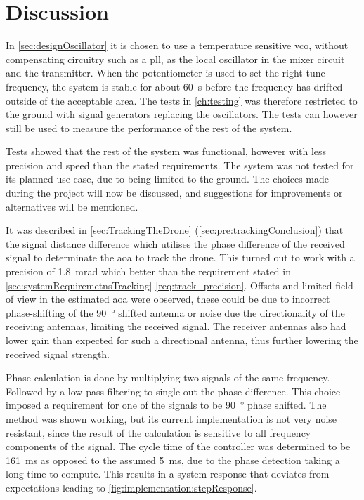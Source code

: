 \chapter{Discussion} \label{ch:Discussion}
In \autoref{sec:designOscillator} it is chosen to use a temperature sensitive \gls{vco}, without compensating circuitry such as a \gls{pll}, as the local oscillator in the mixer circuit and the transmitter. When the potentiometer is used to set the right tune frequency, the system is stable for about \SI{60}{\second} before the frequency has drifted outside of the acceptable area. The tests in \autoref{ch:testing} was therefore restricted to the ground with signal generators replacing the oscillators. The tests can however still be used to measure the performance of the rest of the system.

Tests showed that the rest of the system was functional, however with less precision and speed than the stated requirements. The system was not tested for its planned use case, due to being limited to the ground. The choices made during the project will now be discussed, and suggestions for improvements or alternatives will be mentioned.

It was described in \autoref{sec:TrackingTheDrone} (\autoref{sec:pre:trackingConclusion}) that the signal distance difference which utilises the phase difference of the received signal to determinate the \gls{aoa} to track the drone. This turned out to work with a precision of \SI{1.8}{\milli\radian} which better than the requirement stated in \autoref{sec:systemRequiremetnsTracking} \autoref{req:track_precision}. Offsets and limited field of view in the estimated \gls{aoa} were observed, these could be due to incorrect phase-shifting of the \SI{90}{\degree} shifted antenna or noise due the directionality of the receiving antennas, limiting the received signal. The receiver antennas also had lower gain than expected for such a directional antenna, thus further lowering the received signal strength.

Phase calculation is done by multiplying two signals of the same frequency. Followed by a low-pass filtering to single out the phase difference. This choice imposed a requirement for one of the signals to be \SI{90}{\degree} phase shifted. The method was shown working, but its current implementation is not very noise resistant, since the result of the calculation is sensitive to all frequency components of the signal. The cycle time of the controller was determined to be \SI{161}{\milli\second} as opposed to the assumed \SI{5}{\milli\second}, due to the phase detection taking a long time to compute. This results in a system response that deviates from expectations leading to \autoref{fig:implementation:stepResponse}.

